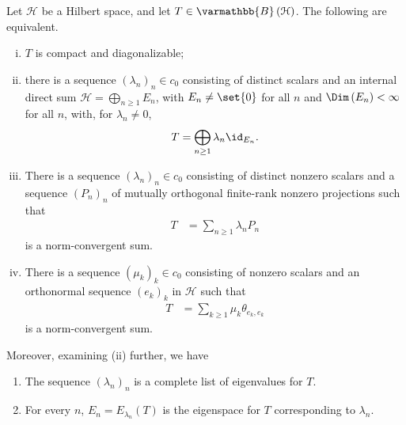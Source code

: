\documentclass[10pt]{mypackage}
\renewcommand*{\mathbb}[1]{\varmathbb{#1}}
\newcommand{\B}{\mathbb{B}}
\begin{document}
\begin{proposition}
  Let $\mathcal{H}$ be a Hilbert space, and let $T\in \B\left(\mathcal{H}\right)$. The following are equivalent.
  \begin{enumerate}[(i)]
    \item $T$ is compact and diagonalizable;
    \item there is a sequence $\left(\lambda_n\right)_n\in c_0$ consisting of distinct scalars and an internal direct sum $\mathcal{H} = \bigoplus_{n\geq 1}E_n$, with $E_n\neq \set{0}$ for all $n$ and $\Dim\left(E_n\right) < \infty$ for all $n$, with, for $\lambda_n\neq 0$,
      \begin{align*}
        T = \bigoplus_{n\geq 1} \lambda_n\id_{E_n}.
      \end{align*}
    \item There is a sequence $\left(\lambda_n\right)_n\in c_0$ consisting of distinct nonzero scalars and a sequence $\left(P_n\right)_n$ of mutually orthogonal finite-rank nonzero projections such that
      \begin{align*}
        T &= \sum_{n\geq 1}\lambda_nP_n
      \end{align*}
      is a norm-convergent sum.
    \item There is a sequence $\left(\mu_k\right)_k\in c_0$ consisting of nonzero scalars and an orthonormal sequence $\left(e_k\right)_k$ in $\mathcal{H}$ such that
      \begin{align*}
        T &= \sum_{k\geq 1}\mu_k\theta_{e_k,e_k}
      \end{align*}
      is a norm-convergent sum.
  \end{enumerate}
  Moreover, examining (ii) further, we have
  \begin{enumerate}[(1)]
    \item The sequence $\left(\lambda_n\right)_n$ is a complete list of eigenvalues for $T$.
    \item For every $n$, $E_{n} = E_{\lambda_n}\left(T\right)$ is the eigenspace for $T$ corresponding to $\lambda_n$.
  \end{enumerate}
\end{proposition}
\end{document}
